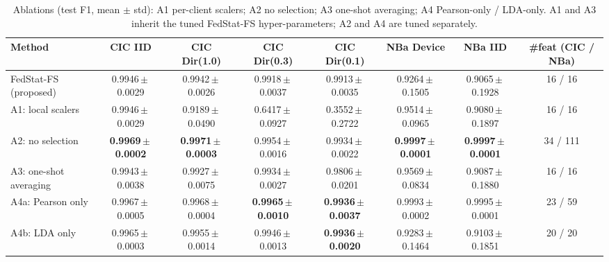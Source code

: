 \begin{table}[t]
\centering
\caption{Ablations (test F1, mean $\pm$ std): A1 per-client scalers; A2 no selection; A3 one-shot averaging; A4 Pearson-only / LDA-only. A1 and A3 inherit the tuned FedStat-FS hyper-parameters; A2 and A4 are tuned separately.}
\label{tab:ablation}
\tiny
\setlength{\tabcolsep}{2.4pt}
\begin{tabular}{lccccccc}
\toprule
Method & CIC IID & CIC Dir(1.0) & CIC Dir(0.3) & CIC Dir(0.1) & NBa Device & NBa IID & \#feat (CIC / NBa) \\
\midrule
FedStat-FS (proposed) & 0.9946\,$\pm$\,0.0029 & 0.9942\,$\pm$\,0.0026 & 0.9918\,$\pm$\,0.0037 & 0.9913\,$\pm$\,0.0035 & 0.9264\,$\pm$\,0.1505 & 0.9065\,$\pm$\,0.1928 & 16 / 16 \\
A1: local scalers & 0.9946\,$\pm$\,0.0029 & 0.9189\,$\pm$\,0.0490 & 0.6417\,$\pm$\,0.0927 & 0.3552\,$\pm$\,0.2722 & 0.9514\,$\pm$\,0.0965 & 0.9080\,$\pm$\,0.1897 & 16 / 16 \\
A2: no selection & \textbf{0.9969\,$\pm$\,0.0002} & \textbf{0.9971\,$\pm$\,0.0003} & 0.9954\,$\pm$\,0.0016 & 0.9934\,$\pm$\,0.0022 & \textbf{0.9997\,$\pm$\,0.0001} & \textbf{0.9997\,$\pm$\,0.0001} & 34 / 111 \\
A3: one-shot averaging & 0.9943\,$\pm$\,0.0038 & 0.9927\,$\pm$\,0.0075 & 0.9934\,$\pm$\,0.0027 & 0.9806\,$\pm$\,0.0201 & 0.9569\,$\pm$\,0.0834 & 0.9087\,$\pm$\,0.1880 & 16 / 16 \\
A4a: Pearson only & 0.9967\,$\pm$\,0.0005 & 0.9968\,$\pm$\,0.0004 & \textbf{0.9965\,$\pm$\,0.0010} & \textbf{0.9936\,$\pm$\,0.0037} & 0.9993\,$\pm$\,0.0002 & 0.9995\,$\pm$\,0.0001 & 23 / 59 \\
A4b: LDA only & 0.9965\,$\pm$\,0.0003 & 0.9955\,$\pm$\,0.0014 & 0.9946\,$\pm$\,0.0013 & \textbf{0.9936\,$\pm$\,0.0020} & 0.9283\,$\pm$\,0.1464 & 0.9103\,$\pm$\,0.1851 & 20 / 20 \\
\bottomrule
\end{tabular}
\end{table}